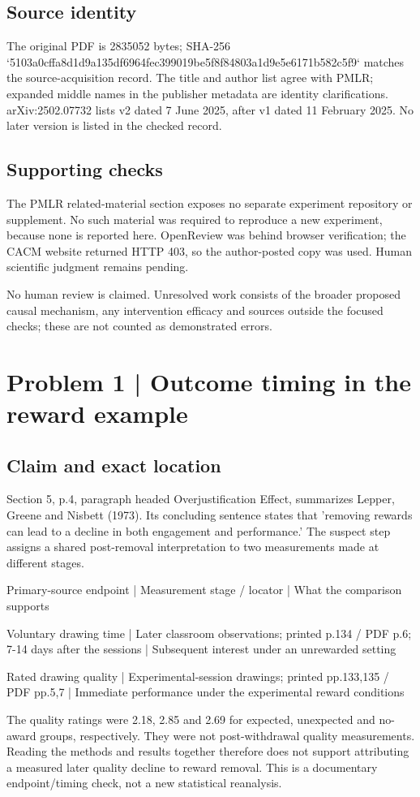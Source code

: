 \documentclass[10pt]{article}
\begin{document}
\subsection*{Source identity}
The original PDF is 2835052 bytes; SHA-256 `5103a0cffa8d1d9a135df6964fec399019be5f8f84803a1d9e5e6171b582c5f9` matches the source-acquisition record. The title and author list agree with PMLR; expanded middle names in the publisher metadata are identity clarifications. arXiv:2502.07732 lists v2 dated 7 June 2025, after v1 dated 11 February 2025. No later version is listed in the checked record.\par
\subsection*{Supporting checks}
The PMLR related-material section exposes no separate experiment repository or supplement. No such material was required to reproduce a new experiment, because none is reported here. OpenReview was behind browser verification; the CACM website returned HTTP 403, so the author-posted copy was used. Human scientific judgment remains pending.\par
No human review is claimed. Unresolved work consists of the broader proposed causal mechanism, any intervention efficacy and sources outside the focused checks; these are not counted as demonstrated errors.\par
\section*{Problem 1 | Outcome timing in the reward example}
\subsection*{Claim and exact location}
Section 5, p.4, paragraph headed Overjustification Effect, summarizes Lepper, Greene and Nisbett (1973). Its concluding sentence states that ’removing rewards can lead to a decline in both engagement and performance.’ The suspect step assigns a shared post-removal interpretation to two measurements made at different stages.\par
Primary-source endpoint | Measurement stage / locator | What the comparison supports\par
Voluntary drawing time | Later classroom observations; printed p.134 / PDF p.6; 7-14 days after the sessions | Subsequent interest under an unrewarded setting\par
Rated drawing quality | Experimental-session drawings; printed pp.133,135 / PDF pp.5,7 | Immediate performance under the experimental reward conditions\par
The quality ratings were 2.18, 2.85 and 2.69 for expected, unexpected and no-award groups, respectively. They were not post-withdrawal quality measurements. Reading the methods and results together therefore does not support attributing a measured later quality decline to reward removal. This is a documentary endpoint/timing check, not a new statistical reanalysis.\par
\end{document}
